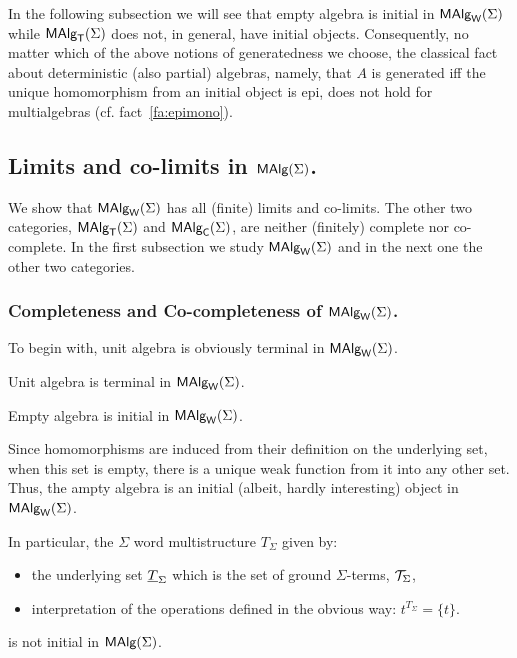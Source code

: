 \documentclass[10pt]{article}
\begin{document}
In the following subsection we will see that empty algebra is initial
in $\mbox{\rm\sf MAlg}_{\sf W}(\Sigma)$ while $\mbox{\rm\sf MAlg}_{\sf T}(\Sigma)$ does not, in general, have initial
objects. Consequently, no matter which of the above notions of
generatedness we choose, the classical fact about deterministic (also
partial) algebras, namely, that $A$ is generated iff the unique
homomorphism from an initial object is epi, does not hold for
multialgebras (cf. fact~\ref{fa:epimono}).


\subsection{Limits and co-limits in $\mbox{\rm\sf MAlg}(\Sigma)$.}
\label{sub:limit}

We show that $\mbox{\rm\sf MAlg}_{\sf W}(\Sigma)$ has all (finite) limits and co-limits. The other
two categories, $\mbox{\rm\sf MAlg}_{\sf T}(\Sigma)$ and $\mbox{\rm\sf MAlg}_{\sf C}(\Sigma)$, are neither (finitely) complete
nor co-complete.  In the first subsection we study $\mbox{\rm\sf MAlg}_{\sf W}(\Sigma)$ and in the
next one the other two categories.

\subsubsection{Completeness and Co-completeness of $\mbox{\rm\sf MAlg}_{\sf W}(\Sigma)$.}

To begin with, unit algebra is obviously terminal in $\mbox{\rm\sf MAlg}_{\sf W}(\Sigma)$.

\begin{Fact}\label{le:init}
Unit algebra is terminal in $\mbox{\rm\sf MAlg}_{\sf W}(\Sigma)$.
\end{Fact}

\begin{Fact}
Empty algebra is initial in $\mbox{\rm\sf MAlg}_{\sf W}(\Sigma)$.
\end{Fact}

\begin{Proof}
Since homomorphisms are induced from their definition on the
underlying set, when this set is empty, there is a unique weak
function from it into any other set. Thus, the ampty algebra is an
initial (albeit, hardly interesting) object in $\mbox{\rm\sf MAlg}_{\sf W}(\Sigma)$.
\end{Proof}

\noindent
In particular, the $\Sigma$ word multistructure $T_\Sigma$ given by:
%
\begin{itemize}\MyLPar
\item 
the underlying set $\underline {T}_\Sigma$ which is the set of ground
$\Sigma$-terms, ${\cal T}_{\Sigma}$,

\item 
interpretation of the operations defined in the obvious way:
$t^{T_{\Sigma}}=\{t\}$.
\end{itemize}
%
is not initial in $\mbox{\rm\sf MAlg}(\Sigma)$.
\end{document}
